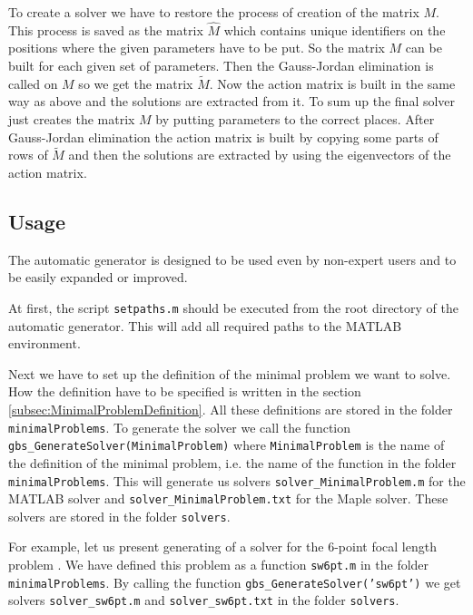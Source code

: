 To create a solver we have to restore the process of creation of the matrix $M$. This process is saved as the matrix $\hat{M}$ which contains unique identifiers on the positions where the given parameters have to be put. So the matrix $M$ can be built for each given set of parameters. Then the Gauss-Jordan elimination is called on $M$ so we get the matrix $\tilde{M}$. Now the action matrix is built in the same way as above and the solutions are extracted from it. To sum up the final solver just creates the matrix $M$ by putting parameters to the correct places. After Gauss-Jordan elimination the action matrix is built by copying some parts of rows of $\tilde{M}$ and then the solutions are extracted by using the eigenvectors of the action matrix.

\subsection{Usage}
The automatic generator is designed to be used even by non-expert users and to be easily expanded or improved.

At first, the script \texttt{setpaths.m} should be executed from the root directory of the automatic generator. This will add all required paths to the MATLAB environment.

Next we have to set up the definition of the minimal problem we want to solve. How the definition have to be specified is written in the section \ref{subsec:MinimalProblemDefinition}. All these definitions are stored in the folder \texttt{minimalProblems}. To generate the solver we call the function \texttt{gbs\_GenerateSolver(MinimalProblem)} where \texttt{MinimalProblem} is the name of the definition of the minimal problem, i.e. the name of the function in the folder \texttt{minimalProblems}. This will generate us solvers \texttt{solver\_MinimalProblem.m} for the MATLAB solver and \texttt{solver\_MinimalProblem.txt} for the Maple solver. These solvers are stored in the folder \texttt{solvers}.

For example, let us present generating of a solver for the 6-point focal length problem \cite{6pt}. We have defined this problem as a function \texttt{sw6pt.m} in the folder \texttt{minimalProblems}. By calling the function \texttt{gbs\_GenerateSolver('sw6pt')} we get solvers \texttt{solver\_sw6pt.m} and \texttt{solver\_sw6pt.txt} in the folder \texttt{solvers}.

